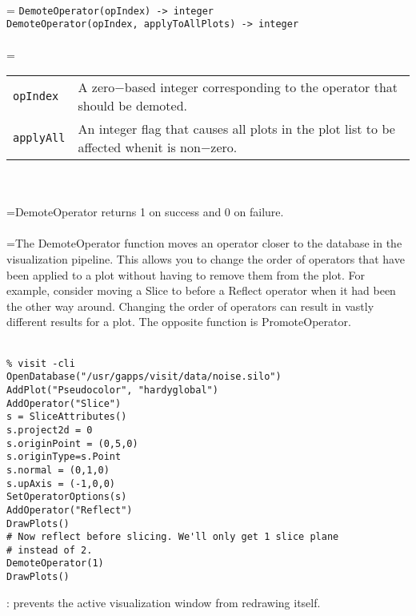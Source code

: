 \documentclass[10pt,a4paper]{report}
\begin{document}
 \\ 
\hangindent=\parindent 
\verb!DemoteOperator(opIndex) -> integer!\\ 
\verb!DemoteOperator(opIndex, applyToAllPlots) -> integer!\\ [-3mm]

 \\ 
\hangindent=\parindent 
\begin{tabular}{lp{9cm}}
\verb!opIndex! & A zero$-$based integer corresponding to the operator that should be demoted. \\
\verb!applyAll! & An integer flag that causes all plots in the plot list to be affected whenit is non$-$zero. \\
\end{tabular} \\[-2mm]


 \\ 
\hangindent=\parindent DemoteOperator returns 1 on success and 0 on failure. \\[-3mm] 

 \\ 
\hangindent=\parindent The DemoteOperator function moves an operator closer to the database in the visualization pipeline. This allows you to change the order of operators that have been applied to a plot without having to remove them from the plot. For example, consider moving a Slice to before a Reflect operator when it had been the other way around. Changing the order of operators can result in vastly different results for a plot. The opposite function is PromoteOperator. \\[-3mm] 

\\[-6mm]
\begin{verbatim}% visit -cli
OpenDatabase("/usr/gapps/visit/data/noise.silo")
AddPlot("Pseudocolor", "hardyglobal")
AddOperator("Slice")
s = SliceAttributes()
s.project2d = 0
s.originPoint = (0,5,0)
s.originType=s.Point
s.normal = (0,1,0)
s.upAxis = (-1,0,0)
SetOperatorOptions(s)
AddOperator("Reflect")
DrawPlots()
# Now reflect before slicing. We'll only get 1 slice plane
# instead of 2.
DemoteOperator(1)
DrawPlots()
\end{verbatim}
\newpage


{}
: prevents the active visualization window from redrawing itself.\\[-3mm]
\end{document}
